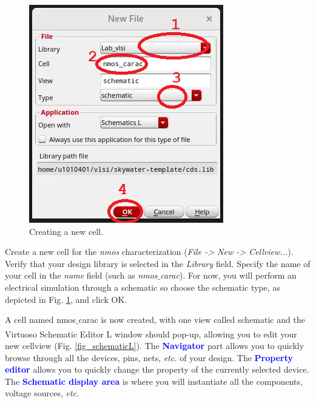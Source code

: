 \begin{enumerate}


	\parbox[t]{\dimexpr\textwidth-\leftmargin}{%
	\begin{figure}
		\vspace{0mm}
		\centering
		\vspace{-\baselineskip}
		\includegraphics[scale=0.6]{figures/lab1_schematic_sim/newcell.png}
\caption{Creating a new cell.}
\label{fig_newcell}
	\end{figure}
	\item Create a new cell for the \textit{nmos} characterization (\textit{File -> New -> Cellview...}). Verify that your design library is selected in the \textit{Library} field. Specify the name of your cell in the \textit{name} field (such as \textit{nmos$\_$carac}). For now, you will perform an electrical simulation through a schematic so choose the schematic type, as depicted in Fig. \ref{fig_newcell}, and click OK.
\item 	A cell named nmos$\_$carac is now created, with one view called schematic and the Virtuoso\textsuperscript{\tiny\textregistered} Schematic Editor L window should pop-up, allowing you to edit your new cellview (Fig. \ref{fig_schematicL}). The \textbf{\textcolor{blue}{Navigator}} part allows you to quickly browse through all the devices, pins, nets, \textit{etc.} of your design. The \textbf{\textcolor{blue}{Property editor}} allows you to quickly change the property of the currently selected device. The \textbf{\textcolor{blue}{Schematic display area}} is where you will instantiate all the components, voltage sources, \textit{etc.}} 


\end{enumerate}
